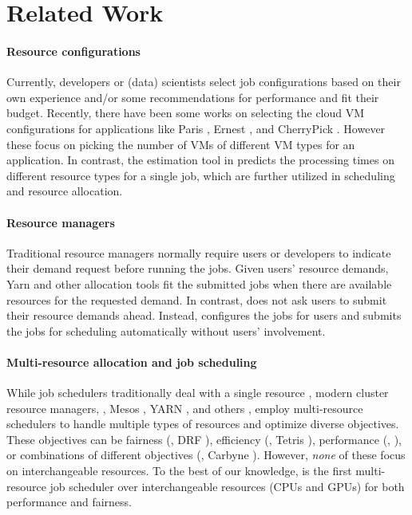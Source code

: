 \section{Related Work}
\label{sec:related}

\paragraph{Resource configurations}
Currently, developers or (data) scientists select job configurations based on their own experience and/or some recommendations for performance and fit their budget. 
Recently, there have been some works on selecting the cloud VM configurations for applications like Paris \cite{paris_socc17}, Ernest \cite{ernest}, and CherryPick \cite{cherrypick}.
However these focus on picking the number of VMs of different VM types for an application. 
In contrast, the estimation tool in \name predicts the processing times on different resource types for a single job, which are further utilized in scheduling and resource allocation.

\paragraph{Resource managers}
Traditional resource managers normally require users or developers to indicate their demand request before running the jobs.
Given users' resource demands, Yarn \cite{yarn} and other allocation tools \cite{omega, borg} fit the submitted jobs when there are available resources for the requested demand.
In contrast, \name does not ask users to submit their resource demands ahead.
Instead, \name configures the jobs for users and submits the jobs for scheduling automatically without users' involvement.

\paragraph{Multi-resource allocation and job scheduling}
While job schedulers traditionally deal with a single resource \cite{late, mantri, quincy}, modern cluster resource managers, \eg, Mesos \cite{mesos}, YARN \cite{yarn}, and others \cite{omega, borg}, employ multi-resource schedulers \cite{drf, sjf, tetris, carbyne} to handle multiple types of resources and optimize diverse objectives. 
These objectives can be fairness (\eg, DRF \cite{drf}), efficiency (\eg, Tetris \cite{tetris}), performance (\eg, \cite{sjf}), or combinations of different objectives (\eg, Carbyne \cite{carbyne}).
% 
However, \emph{none} of these focus on interchangeable resources.  %
To the best of our knowledge, {\name} is the first multi-resource job scheduler over interchangeable resources (CPUs and GPUs) for both performance and fairness.

